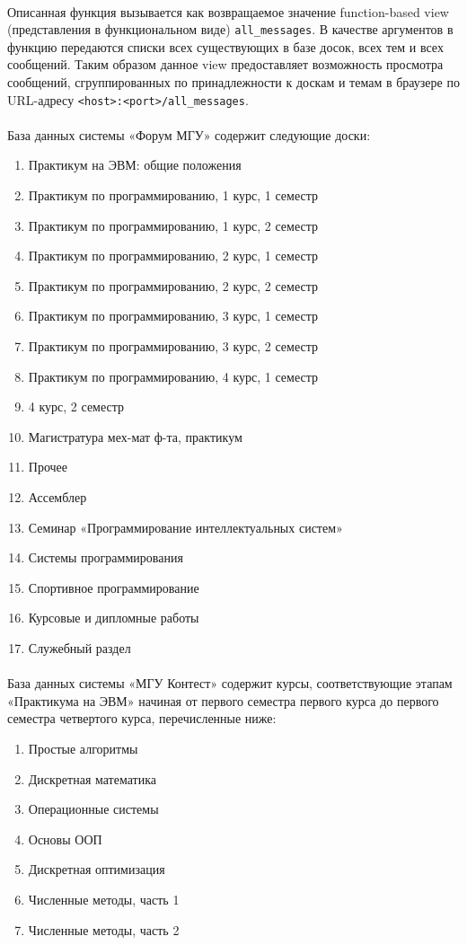 \documentclass[12pt, a4paper, oneside]{article}
\begin{document}
\paragraph{}
Описанная функция вызывается как возвращаемое значение function-based view (представления в функциональном виде) \texttt{all\_messages}. В качестве аргументов в функцию передаются списки всех существующих в базе досок, всех тем и всех сообщений. Таким образом данное view предоставляет возможность просмотра сообщений, сгруппированных по принадлежности к доскам и темам в браузере по URL-адресу \texttt{<host>:<port>/all\_messages}.
\paragraph{}
База данных системы «Форум МГУ» содержит следующие доски:
\begin{enumerate}
    \item Практикум на ЭВМ: общие положения
    \item Практикум по программированию, 1 курс, 1 семестр
    \item Практикум по программированию, 1 курс, 2 семестр
    \item Практикум по программированию, 2 курс, 1 семестр
    \item Практикум по программированию, 2 курс, 2 семестр
    \item Практикум по программированию, 3 курс, 1 семестр
    \item Практикум по программированию, 3 курс, 2 семестр
    \item Практикум по программированию, 4 курс, 1 семестр
    \item 4 курс, 2 семестр
    \item Магистратура мех-мат ф-та, практикум
    \item Прочее
    \item Ассемблер
    \item Семинар «Программирование интеллектуальных систем»
    \item Системы программирования
    \item Спортивное программирование
    \item Курсовые и дипломные работы
    \item Служебный раздел
\end{enumerate}
\paragraph{}
База данных системы «МГУ Контест» содержит курсы, соответствующие этапам «Практикума на ЭВМ» начиная от первого семестра первого курса до первого семестра четвертого курса, перечисленные ниже:
\begin{enumerate}
    \item Простые алгоритмы
    \item Дискретная математика
    \item Операционные системы
    \item Основы ООП
    \item Дискретная оптимизация
    \item Численные методы, часть 1
    \item Численные методы, часть 2
\end{enumerate}
\end{document}
